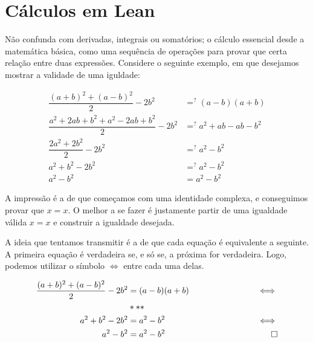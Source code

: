 \section{Cálculos em Lean}
Não confunda com derivadas, integrais ou somatórios; o cálculo essencial desde a matemática básica, como uma sequência de operações para provar que certa relação entre duas expressões. Considere o seguinte exemplo, em que desejamos mostrar a validade de uma iguldade:

\begin{equation*}
    \begin{aligned}
      \dfrac{(a+b)^2+(a-b)^2}{2}-2b^2 &=^? (a-b)(a+b)\\
      \dfrac{a^2+2ab+b^2+a^2-2ab+b^2}{2}-2b^2 &=^? a^2+ab-ab-b^2\\
      \dfrac{2a^2+2b^2}{2}-2b^2 &=^? a^2-b^2\\
      a^2+b^2-2b^2 &=^? a^2-b^2\\
      a^2-b^2 &= a^2-b^2
    \end{aligned}
\end{equation*}

\noindent A impressão é a de que começamos com uma identidade complexa, e conseguimos provar que $x=x$. O melhor a se fazer é justamente partir de uma igualdade válida $x=x$ e construir a igualdade desejada.



A ideia que tentamos transmitir é a de que cada equação é equivalente a seguinte. A primeira equação é verdadeira se, e só se, a próxima for verdadeira. Logo, podemos utilizar o símbolo $\iff$ entre cada uma delas.

  \begin{equation*}
    \begin{aligned}
      \dfrac{(a+b)^2+(a-b)^2}{2}-2b^2 &= (a-b)(a+b) &\hspace{25mm}\iff \\
      &***&\\
      a^2+b^2-2b^2 &= a^2-b^2 &\hspace{25mm}\iff \\
      a^2-b^2 &= a^2-b^2 & \hspace{25mm}\square
    \end{aligned}
  \end{equation*}

